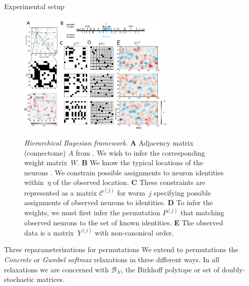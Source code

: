 \documentclass[final]{beamer}
\begin{document}
\begin{frame}[allowframebreaks]
\begin{minipage}[htp][1\textheight][t]{\textwidth}
\begin{columns}[t]
\begin{column}{.5\linewidth}
\begin{block}{Experimental setup}
\begin{figure}[t]
  \centering
  \includegraphics[width=0.7\textwidth]{figs/Figure3.pdf} 
  \caption\large {\textit{Hierarchical Bayesian framework}.  \textbf{A} Adjacency matrix (connectome) $A$ from
    \cite{varshney2011structural}.  We wish to infer the
    corresponding weight matrix~$W$. \textbf{B} We know the typical locations of the
    neurons \cite{white1986structure,wormatlas}. 
    We constrain possible assignments to neuron identities
    within~$\eta$ of the observed location.  \textbf{C} These
    constraints are represented as a matrix $\mathcal{C}^{(j)}$ for
    worm~$j$ specifying possible assignments of observed neurons
    to identities.     \textbf{D} To infer the weights, we must first infer the
    permutation $P^{(j)}$ that matching observed neurons to the set of known identities.  \textbf{E} The observed
    data is a matrix~$Y^{(j)}$  with non-canonical order. }

\label{fig:1}
\end{figure}



	   \end{block}
   	
	
	  \begin{block}{Three reparameterizations for permutations}
\large  We extend to permutations the \emph{Concrete} or \emph{Gumbel softmax} relaxations \cite{Jang2016,Maddison2016} in three different ways. In all relaxations we are concerned with $\mathcal{B}_N$, the Birkhoff polytope or set of doubly-stochastic matrices. 
	  \end{block}
            \end{column}    


            
            \begin{column}{.5\linewidth}
           

\end{column}
\end{columns}
\end{minipage}
\end{frame}
\end{document}
